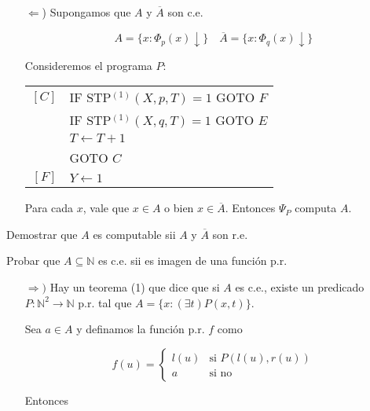 \begin{questions}
\begin{solution}
\begin{itemize}
 \item[$\Leftarrow$)] Supongamos que $A$ y $\overline{A}$ son c.e.
 
 \begin{equation*}
  A = \{x : \Phi_p(x)\downarrow \} \quad \overline{A} = \{x : \Phi_q(x)\downarrow \}
 \end{equation*}
 
 Consideremos el programa $P$: 
 
  \vspace{0.5cm}
  \begin{tabular}{rl}
    $[C]$ & IF STP$^{(1)}(X,p,T) = 1$ GOTO $F$ \\
	  & IF STP$^{(1)}(X,q,T) = 1$ GOTO $E$ \\
	  & $T\leftarrow T+1$ \\
	  & GOTO $C$ \\
    $[F]$ & $Y\leftarrow 1$ \\
  \end{tabular}
  \vspace{0.5cm}

  Para cada $x$, vale que $x\in A$ o bien $x\in\overline{A}$. Entonces $\Psi_P$ computa $A$. 
\end{itemize}

\end{solution}

\question Demostrar que $A$ es computable sii $A$ y $\overline{A}$ son r.e.


\question Probar que $A \subseteq \mathbb{N}$ es c.e. sii es imagen de una funci\'on p.r.


\begin{solution}

\begin{itemize}
 \item[$\Rightarrow)$] Hay un teorema (1) que dice que si $A$ es c.e., existe un predicado $P : \mathbb{N}^2\rightarrow\mathbb{N}$ p.r. tal que $A=\{x : (\exists t)P(x,t)\}$.

    Sea $a\in A$ y definamos la funci\'on p.r. $f$ como 

    $$
    f(u) = \left\{
    \begin{array}{cl}
    l(u) & \mbox{si } P(l(u),r(u)) \\
    a & \mbox{si no} 
    \end{array}\right.
    $$

    Entonces 


\end{itemize}
\end{solution}
\end{questions}
